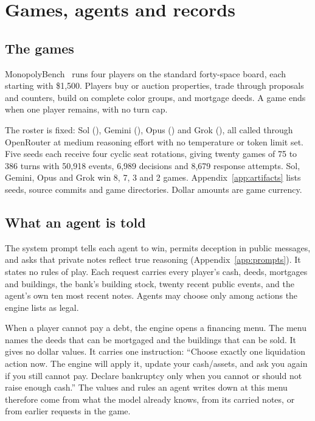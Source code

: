 \section{Games, agents and records}
\label{sec:setting}

\subsection{The games}
MonopolyBench~\cite{bharti2026monopolybench} runs four players on the standard forty-space board, each starting with \$1,500. Players buy or auction properties, trade through proposals and counters, build on complete color groups, and mortgage deeds. A game ends when one player remains, with no turn cap.

The roster is fixed: Sol (), Gemini (), Opus () and Grok (), all called through OpenRouter at medium reasoning effort with no temperature or token limit set. Five seeds each receive four cyclic seat rotations, giving twenty games of 75 to 386 turns with 50,918 events, 6,989 decisions and 8,679 response attempts. Sol, Gemini, Opus and Grok win 8, 7, 3 and 2 games. Appendix~\ref{app:artifacts} lists seeds, source commits and game directories. Dollar amounts are game currency.

\subsection{What an agent is told}
The system prompt tells each agent to win, permits deception in public messages, and asks that private notes reflect true reasoning (Appendix~\ref{app:prompts}). It states no rules of play. Each request carries every player's cash, deeds, mortgages and buildings, the bank's building stock, twenty recent public events, and the agent's own ten most recent notes. Agents may choose only among actions the engine lists as legal.

When a player cannot pay a debt, the engine opens a financing menu. The menu names the deeds that can be mortgaged and the buildings that can be sold. It gives no dollar values. It carries one instruction: ``Choose exactly one liquidation action now. The engine will apply it, update your cash/assets, and ask you again if you still cannot pay. Declare bankruptcy only when you cannot or should not raise enough cash.'' The values and rules an agent writes down at this menu therefore come from what the model already knows, from its carried notes, or from earlier requests in the game.

